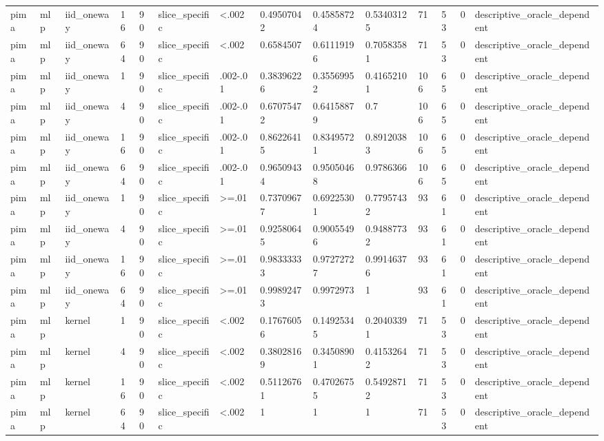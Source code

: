 \begin{tabular}{llllllllllllll}
pima & mlp & iid\_oneway & 16 & 90 & slice\_specific & <.002 & 0.49507042 & 0.45858724 & 0.53403125 & 71 & 53 & 0 & descriptive\_oracle\_dependent \\
pima & mlp & iid\_oneway & 64 & 90 & slice\_specific & <.002 & 0.6584507 & 0.61119196 & 0.70583581 & 71 & 53 & 0 & descriptive\_oracle\_dependent \\
pima & mlp & iid\_oneway & 1 & 90 & slice\_specific & .002-.01 & 0.38396226 & 0.35569952 & 0.41652101 & 106 & 65 & 0 & descriptive\_oracle\_dependent \\
pima & mlp & iid\_oneway & 4 & 90 & slice\_specific & .002-.01 & 0.67075472 & 0.64158879 & 0.7 & 106 & 65 & 0 & descriptive\_oracle\_dependent \\
pima & mlp & iid\_oneway & 16 & 90 & slice\_specific & .002-.01 & 0.86226415 & 0.83495721 & 0.89120383 & 106 & 65 & 0 & descriptive\_oracle\_dependent \\
pima & mlp & iid\_oneway & 64 & 90 & slice\_specific & .002-.01 & 0.96509434 & 0.95050468 & 0.9786366 & 106 & 65 & 0 & descriptive\_oracle\_dependent \\
pima & mlp & iid\_oneway & 1 & 90 & slice\_specific & >=.01 & 0.73709677 & 0.69225301 & 0.77957432 & 93 & 61 & 0 & descriptive\_oracle\_dependent \\
pima & mlp & iid\_oneway & 4 & 90 & slice\_specific & >=.01 & 0.92580645 & 0.90055496 & 0.94887732 & 93 & 61 & 0 & descriptive\_oracle\_dependent \\
pima & mlp & iid\_oneway & 16 & 90 & slice\_specific & >=.01 & 0.98333333 & 0.97272727 & 0.99146376 & 93 & 61 & 0 & descriptive\_oracle\_dependent \\
pima & mlp & iid\_oneway & 64 & 90 & slice\_specific & >=.01 & 0.99892473 & 0.9972973 & 1 & 93 & 61 & 0 & descriptive\_oracle\_dependent \\
pima & mlp & kernel & 1 & 90 & slice\_specific & <.002 & 0.17676056 & 0.14925345 & 0.20403391 & 71 & 53 & 0 & descriptive\_oracle\_dependent \\
pima & mlp & kernel & 4 & 90 & slice\_specific & <.002 & 0.38028169 & 0.34508901 & 0.41532642 & 71 & 53 & 0 & descriptive\_oracle\_dependent \\
pima & mlp & kernel & 16 & 90 & slice\_specific & <.002 & 0.51126761 & 0.47026755 & 0.54928712 & 71 & 53 & 0 & descriptive\_oracle\_dependent \\
pima & mlp & kernel & 64 & 90 & slice\_specific & <.002 & 1 & 1 & 1 & 71 & 53 & 0 & descriptive\_oracle\_dependent \\

\end{tabular}

